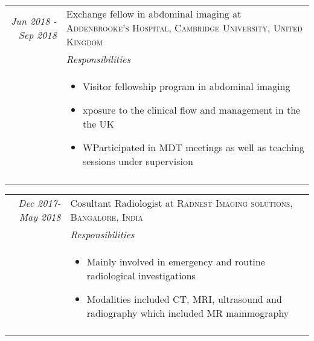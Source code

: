 \documentclass[a4paper,10pt]{article}
\begin{document}
\begin{tabular}{r|p{11cm}}
\emph{Jun 2018 -Sep 2018} & Exchange fellow in abdominal imaging at \textsc{Addenbrooke's Hospital, Cambridge University, United Kingdom} \\
 
\textsc{}&\emph{Responsibilities}\\&\footnotesize{

\begin{itemize} 
        \vspace{-0.2cm}\item Visitor fellowship program in abdominal imaging
        \vspace{-0.2cm}\item xposure to the clinical flow and management in the the UK
        \vspace{-0.2cm}\item WParticipated in MDT meetings as well as teaching sessions under supervision
     \end{itemize}
}\\\multicolumn{2}{c}{} \\
\end{tabular}
\vspace{-0.2cm}

\begin{tabular}{r|p{11cm}}
\emph{Dec 2017-May 2018} & Cosultant Radiologist at \textsc{Radnest Imaging solutions, Bangalore, India} \\
 
\textsc{}&\emph{Responsibilities}\\&\footnotesize{

\begin{itemize} 
        \vspace{-0.2cm}\item Mainly involved in emergency and routine radiological investigations
        \vspace{-0.2cm}\item Modalities included CT, MRI, ultrasound and radiography which included MR mammography
     \end{itemize}
}\\\multicolumn{2}{c}{} \\
\end{tabular}
\vspace{-0.2cm}
\end{document}
